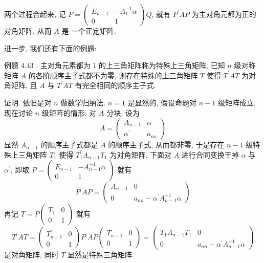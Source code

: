\documentclass{article}
\begin{document}
两个过程合起来, 记 $P=\left(\begin{array}{cc}E_{n-1} & -A_{1}^{-1} \alpha \\ 0 & 1\end{array}\right) Q$, 就有 $P^{\prime} A P$ 为主对角元都为正的对角矩阵, 从而 $A$ 是
一个正定矩阵.

进一步, 我们还有下面的例题:

\vspace{1ex}
{\heiti 例题 4.43 .} {\kaishu 主对角元素都为 1 的上三角矩阵称为特殊上三角矩阵, 已知 $n$ 级对称矩阵 $A$ 的各阶顺序主子式都不为零, 则存在特殊的上三角矩阵 $T$ 使得 $T^{\prime} A T$ 为对角矩阵, 且 $A$ 与 $T^{\prime} A T$ 有完全相同的顺序主子式.}

\vspace{1ex}
证明. 依旧是对 $n$ 做数学归纳法. $n=1$ 是显然的, 假设命题对 $n-1$ 级矩阵成立, 现在讨论 $n$ 级矩阵的情形: 对 $A$ 分块, 设为
\begin{equation*}
    A=\left(\begin{array}{cc}
        A_{n-1}         & \alpha  \\
        \alpha^{\prime} & a_{n n}
    \end{array}\right)
\end{equation*}
显然 $A_{n-1}$ 的顺序主子式都是 $A$ 的顺序主子式, 从而都非零, 于是存在 $n-1$ 级特殊上三角矩阵 $T_{1}$ 使得 $T_{1}^{\prime} A_{n-1} T_{1}$ 为对角矩阵. 下面对 $A$ 进行合同变换干掉 $\alpha$ 与 $\alpha^{\prime}$, 即取 $P=\left(\begin{array}{cc}E_{n-1} & -A_{n-1}^{-1} \alpha \\ 0 & 1\end{array}\right)$ 就有
\begin{equation*}
    P^{\prime} A P=\left(\begin{array}{cc}
            A_{n-1} & 0                                           \\
            0       & a_{n n}-\alpha^{\prime} A_{n-1}^{-1} \alpha
        \end{array}\right)
\end{equation*}
再记 $T=P\left(\begin{array}{cc}T_{1} & 0 \\ 0 & 1\end{array}\right)$ 就有
\begin{equation*}
    T^{\prime} A T=\left(\begin{array}{cc}
            T_{n-1}^{\prime} & 0 \\
            0                & 1
        \end{array}\right) P^{\prime} A P\left(\begin{array}{cc}
            T_{n-1} & 0 \\
            0       & 1
        \end{array}\right)=\left(\begin{array}{cc}
            T_{1}^{\prime} A_{n-1} T_{1} & 0                                           \\
            0                            & a_{n n}-\alpha^{\prime} A_{n-1}^{-1} \alpha
        \end{array}\right)
\end{equation*}
是对角矩阵, 同时 $T$ 显然是特殊三角矩阵.
\end{document}
